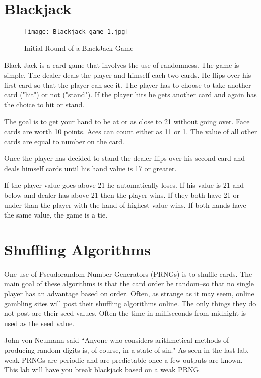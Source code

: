 \label{Ch:BJ}


\section*{Blackjack}

\begin{figure}[H]
\texttt{[image: Blackjack\_game\_1.jpg]}
\caption{Initial Round of a BlackJack Game}
\end{figure}

Black Jack is a card game that involves the use of randomness.
The game is simple.
The dealer deals the player and himself each two cards.
He flips over his first card so that the player can see it.
The player has to choose to take another card ("hit") or not ("stand").
If the player hits he gets another card and again has the choice to hit or stand.

The goal is to get your hand to be at or as close to 21 without going over.
Face cards are worth 10 points.
Aces can count either as 11 or 1.
The value of all other cards are equal to number on the card.

Once the player has decided to stand the dealer flips over his second card and deals himself cards until his hand value is 17 or greater. 

If the player value goes above 21 he automatically loses.
If his value is 21 and below and dealer has above 21 then the player wins.
If they both have 21 or under than the player with the hand of highest value wins.
If both hands have the same value, the game is a tie.

\section*{Shuffling Algorithms}

One use of Pseudorandom Number Generators (PRNGs) is to shuffle cards.
The main goal of these algorithms is that the card order be random--so that no single player has an advantage based on order.
Often, as strange as it may seem, online gambling sites will post their shuffling algorithms online.
The only things they do not post are their seed values.
Often the time in milliseconds from midnight is used as the seed value.

John von Neumann said ``Anyone who considers arithmetical methods of producing random digits is, of course, in a state of sin."
As seen in the last lab, weak PRNGs are periodic and are predictable once a few outputs are known.
This lab will have you break blackjack based on a weak PRNG.

